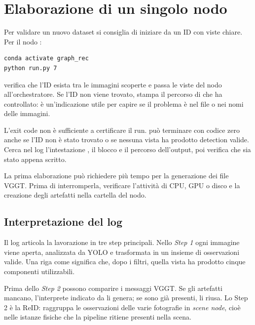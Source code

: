 \section{Elaborazione di un singolo nodo}

Per validare un nuovo dataset si consiglia di iniziare da un ID con viste
chiare. Per il nodo :

\begin{lstlisting}[language={}]
conda activate graph_rec
python run.py 7
\end{lstlisting}

 verifica che l'ID esista tra le immagini scoperte e passa le
viste del nodo all'orchestratore. Se l'ID non viene trovato, stampa il percorso
di  che ha controllato: è un'indicazione utile per capire se
il problema è nel file  o nei nomi delle immagini.

L'exit code non è sufficiente a certificare il run.  può
terminare con codice zero anche se l'ID non è stato trovato o se nessuna vista
ha prodotto detection valide. Cerca nel log l'intestazione , il
blocco  e il percorso dell'output, poi verifica che
 sia stato appena scritto.

La prima elaborazione può richiedere più tempo per la generazione dei file
VGGT. Prima di interromperla, verificare l'attività di CPU, GPU o disco e la
creazione degli artefatti nella cartella del nodo.

\subsection{Interpretazione del log}

Il log articola la lavorazione in tre step principali. Nello
\emph{Step 1} ogni immagine viene aperta, analizzata da YOLO e trasformata in un
insieme di osservazioni valide. Una riga come
 significa che, dopo i filtri, quella vista ha
prodotto cinque componenti utilizzabili.

Prima dello \emph{Step 2} possono comparire i messaggi VGGT. Se gli artefatti
 mancano, l'interprete indicato da
 li genera; se sono già presenti, li riusa. Lo
Step 2 è la ReID: raggruppa le osservazioni delle varie fotografie in
\emph{scene node}, cioè nelle istanze fisiche che la pipeline ritiene presenti
nella scena.

